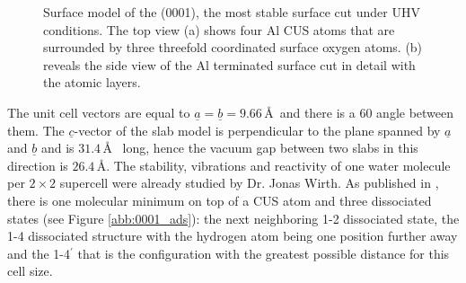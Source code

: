 \documentclass[11pt,DIV=13,BCOR=5mm,a4paper,headinclude]{scrbook}
\renewcommand{\vec}[1]{\underline{#1}}
\begin{document}
\begin{figure}[!ht]
 \centering
{}
 \quad\quad
 \caption{Surface model of the (0001), the most stable surface cut under UHV conditions.
The top view (a) shows four Al CUS atoms that are surrounded by three threefold coordinated surface oxygen atoms.
(b) reveals the side view of the Al terminated surface cut in detail with the atomic layers.}
        \label{abb:surf_0001}
\end{figure}
The unit cell vectors are equal to $\vec{a}=\vec{b}=9.66\,$\AA  ~and there is a $60$\textdegree{} angle between them.
The $\vec{c}$-vector of the slab model is perpendicular to the plane spanned by $\vec{a}$ and $\vec{b}$ and is $31.4\,$\AA~ long, hence the vacuum gap between two slabs in this direction is $26.4\,$\AA.
The stability, vibrations and reactivity of one water  molecule per $2\times 2$ supercell were already studied by Dr. Jonas Wirth.
As published in \cite{WirthJPCC2012}, there is one molecular minimum on top of a CUS atom and three dissociated states (see Figure \ref{abb:0001_ads}): the next neighboring 1-2 dissociated state, the 1-4 dissociated structure with the hydrogen atom being one position further away and the 1-4$^\prime$ that is the configuration with the greatest possible distance for this cell size.
\end{document}
